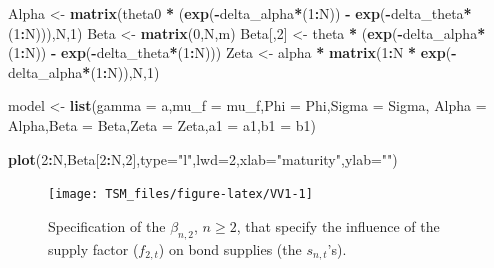 \documentclass[
  12pt,
]{book}
\newenvironment{Shaded}{\begin{snugshade}}{\end{snugshade}}
\newcommand{\AttributeTok}[1]{\textcolor[rgb]{0.13,0.29,0.53}{#1}}
\newcommand{\DecValTok}[1]{\textcolor[rgb]{0.00,0.00,0.81}{#1}}
\newcommand{\FunctionTok}[1]{\textcolor[rgb]{0.13,0.29,0.53}{\textbf{#1}}}
\newcommand{\NormalTok}[1]{#1}
\newcommand{\OtherTok}[1]{\textcolor[rgb]{0.56,0.35,0.01}{#1}}
\newcommand{\SpecialCharTok}[1]{\textcolor[rgb]{0.81,0.36,0.00}{\textbf{#1}}}
\newcommand{\StringTok}[1]{\textcolor[rgb]{0.31,0.60,0.02}{#1}}
\theoremstyle{definition}
\theoremstyle{definition}
\theoremstyle{definition}
\theoremstyle{definition}
\theoremstyle{remark}
\begin{document}
\begin{Shaded}
\begin{Highlighting}[]
\NormalTok{Alpha      }\OtherTok{\textless{}{-}} \FunctionTok{matrix}\NormalTok{(theta0 }\SpecialCharTok{*}\NormalTok{ (}\FunctionTok{exp}\NormalTok{(}\SpecialCharTok{{-}}\NormalTok{delta\_alpha}\SpecialCharTok{*}\NormalTok{(}\DecValTok{1}\SpecialCharTok{:}\NormalTok{N)) }\SpecialCharTok{{-}}
                                 \FunctionTok{exp}\NormalTok{(}\SpecialCharTok{{-}}\NormalTok{delta\_theta}\SpecialCharTok{*}\NormalTok{(}\DecValTok{1}\SpecialCharTok{:}\NormalTok{N))),N,}\DecValTok{1}\NormalTok{)}
\NormalTok{Beta      }\OtherTok{\textless{}{-}} \FunctionTok{matrix}\NormalTok{(}\DecValTok{0}\NormalTok{,N,m)}
\NormalTok{Beta[,}\DecValTok{2}\NormalTok{]  }\OtherTok{\textless{}{-}}\NormalTok{ theta }\SpecialCharTok{*}\NormalTok{ (}\FunctionTok{exp}\NormalTok{(}\SpecialCharTok{{-}}\NormalTok{delta\_alpha}\SpecialCharTok{*}\NormalTok{(}\DecValTok{1}\SpecialCharTok{:}\NormalTok{N)) }\SpecialCharTok{{-}}
                        \FunctionTok{exp}\NormalTok{(}\SpecialCharTok{{-}}\NormalTok{delta\_theta}\SpecialCharTok{*}\NormalTok{(}\DecValTok{1}\SpecialCharTok{:}\NormalTok{N)))}
\NormalTok{Zeta      }\OtherTok{\textless{}{-}}\NormalTok{ alpha }\SpecialCharTok{*} \FunctionTok{matrix}\NormalTok{(}\DecValTok{1}\SpecialCharTok{:}\NormalTok{N }\SpecialCharTok{*} \FunctionTok{exp}\NormalTok{(}\SpecialCharTok{{-}}\NormalTok{delta\_alpha}\SpecialCharTok{*}\NormalTok{(}\DecValTok{1}\SpecialCharTok{:}\NormalTok{N)),N,}\DecValTok{1}\NormalTok{)}

\NormalTok{model }\OtherTok{\textless{}{-}} \FunctionTok{list}\NormalTok{(}\AttributeTok{gamma =}\NormalTok{ a,}\AttributeTok{mu\_f =}\NormalTok{ mu\_f,}\AttributeTok{Phi =}\NormalTok{ Phi,}\AttributeTok{Sigma =}\NormalTok{ Sigma,}
              \AttributeTok{Alpha =}\NormalTok{ Alpha,}\AttributeTok{Beta =}\NormalTok{ Beta,}\AttributeTok{Zeta =}\NormalTok{ Zeta,}\AttributeTok{a1 =}\NormalTok{ a1,}\AttributeTok{b1 =}\NormalTok{ b1)}

\FunctionTok{plot}\NormalTok{(}\DecValTok{2}\SpecialCharTok{:}\NormalTok{N,Beta[}\DecValTok{2}\SpecialCharTok{:}\NormalTok{N,}\DecValTok{2}\NormalTok{],}\AttributeTok{type=}\StringTok{"l"}\NormalTok{,}\AttributeTok{lwd=}\DecValTok{2}\NormalTok{,}\AttributeTok{xlab=}\StringTok{"maturity"}\NormalTok{,}\AttributeTok{ylab=}\StringTok{""}\NormalTok{)}
\end{Highlighting}
\end{Shaded}

\begin{figure}
\texttt{[image: TSM\_files/figure-latex/VV1-1]} \caption{Specification of the $\beta_{n,2}$, $n\ge 2$, that specify the influence of the supply factor ($f_{2,t}$) on bond supplies (the $s_{n,t}$'s).}\label{fig:VV1}
\end{figure}
\end{document}
